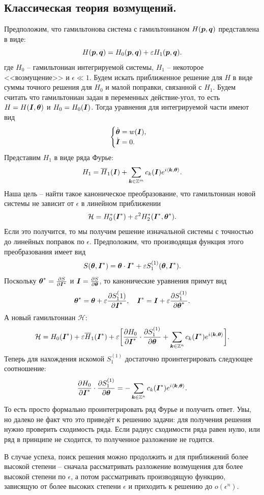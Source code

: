 \subsection{Классическая теория возмущений.}
Предположим, что гамильтонова система с гамильтонианом $H(\boldsymbol{p}, \boldsymbol{q})$ представлена в виде:
\[
    H(\boldsymbol{p}, \boldsymbol{q}) = H_0(\boldsymbol{p}, \boldsymbol{q}) + \varepsilon H_1(\boldsymbol{p}, \boldsymbol{q}).
\]
где $H_0$ -- гамильтониан интегрируемой системы, $H_1$ -- некоторое <<возмущение>> и $\epsilon \ll 1$.
Будем искать приближенное решение для $H$ в виде суммы точного решения для $H_0$ и малой поправки, связанной с $H_1$.
Будем считать что гамильтониан задан в переменных действие-угол, то есть $H = H(\boldsymbol{I}, \boldsymbol{\theta})$ и $H_0 = H_0(\boldsymbol{I})$.
Тогда уравнения для интегрируемой части имеют вид
\[
    \begin{cases}
        \dot{\boldsymbol{\theta}} = w(\boldsymbol{I}), \\
        \dot{\boldsymbol{I}} = 0.
    \end{cases}
\]
Представим $H_1$ в виде ряда Фурье:
\[
    H_1 = \overline{H}_1(\boldsymbol{I}) + \sum_{\boldsymbol{k} \in \mathbb{Z}^m} c_k(\boldsymbol{I}) e^{i \langle \boldsymbol{k}, \boldsymbol{\theta} \rangle}.
\]
Наша цель -- найти такое каноническое преобразование, что гамильтониан новой системы не зависит от $\epsilon$ в линейном приближении \[\mathcal{H} = H_0^*(\boldsymbol{I}^*) + \varepsilon^2 H_2^*(\boldsymbol{I}^*, \boldsymbol{\theta}^*).\]
Если это получится, то мы получим решение изначальной системы с точностью до линейных поправок по $\epsilon$.
Предположим, что производящая функция этого преобразования имеет вид
\[
    S(\boldsymbol{\theta}, \boldsymbol{I}^*) = \boldsymbol{\theta} \cdot \boldsymbol{I}^* + \varepsilon S_1^{(1)}(\boldsymbol{\theta}, \boldsymbol{I}^*).
\]
Поскольку $\boldsymbol{\theta}^* = \frac{\partial S}{\partial \boldsymbol{I}^*}$ и $\boldsymbol{I} = \frac{\partial S}{\partial \boldsymbol{\theta}}$, то канонические уравнения примут вид
\[
        \boldsymbol{\theta}^* = \boldsymbol{\theta} + \varepsilon \dfrac{\partial S_1^(1)}{\partial \boldsymbol{I}^*}, \quad
        \boldsymbol{I}^* = \boldsymbol{I} + \varepsilon \dfrac{\partial S_1^{(1)}}{\partial \boldsymbol{\theta}^*}.
\]
А новый гамильтониан $\mathcal{H}$:
\[
    \mathcal{H} = H_0(\boldsymbol{I}^*) + \varepsilon \overline{H}_1(\boldsymbol{I}^*) + \varepsilon \biggr[ \dfrac{\partial H_0}{\partial \boldsymbol{I}^*} \cdot \dfrac{\partial S_1^{(1)}}{\partial \boldsymbol{\theta}} + \sum\limits_{\boldsymbol{k} \in \mathbb{Z}^n} c_k(\boldsymbol{I}^*) e^{i\langle \boldsymbol{k}, \boldsymbol{\theta} \rangle}\biggr].
\]
Теперь для нахождения искомой $S_1^{(1)}$ достаточно проинтегрировать следующее соотношение:
\[
    \dfrac{\partial H_0}{\partial \boldsymbol{I}^*} \cdot \dfrac{\partial S_1^{(1)}}{\partial \boldsymbol{\theta}} = -\sum\limits_{\boldsymbol{k} \in \mathbb{Z}^n} c_k(\boldsymbol{I}^*)e^{i\langle \boldsymbol{k}, \boldsymbol{\theta} \rangle}.
\]
То есть просто формально проинтегрировать ряд Фурье и получить ответ.
Увы, но далеко не факт что это приведёт к решению задачи: для получения решения нужно проверить сходимость ряда.
Если радиус сходимости ряда равен нулю, или ряд в принципе не сходится, то полученное разложение не годится.

В случае успеха, поиск решения можно продолжить и для приближений более высокой степени -- сначала рассматривать разложение возмущения для более высокой степени по $\epsilon$, а потом рассматривать производящую функцию, зависящую от более высоких степени $\epsilon$ и приходить к решению до $o(\epsilon^n)$.
